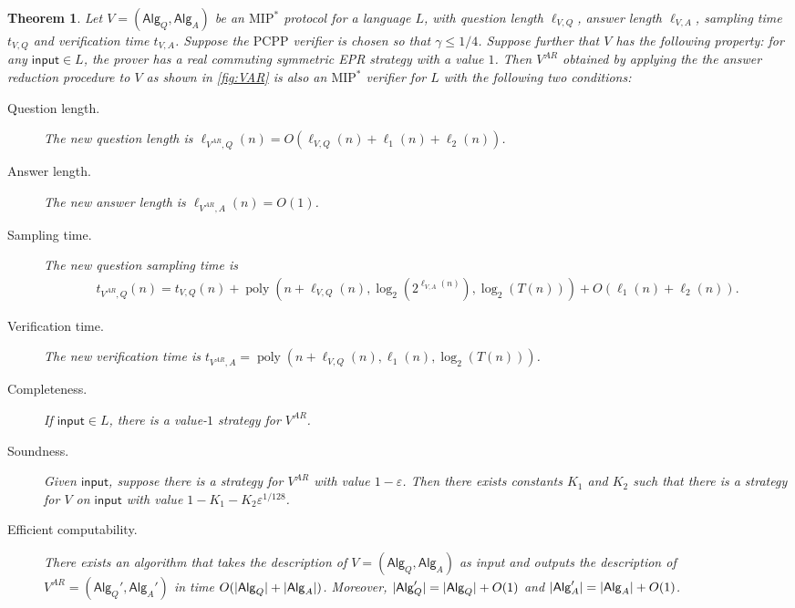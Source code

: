 \documentclass[10pt,a4paper]{article}
\theoremstyle{plain}
\newtheorem{theorem}{Theorem}[section]
\theoremstyle{definition}
\DeclarePairedDelimiter{\abs}{\lvert}{\rvert}
\newcommand{\poly} {\ensuremath{\operatorname{poly}}}
\newcommand{\ep} {\ensuremath{\varepsilon}}
\newcommand{\1}{\mathbb{1}} %
\newcommand{\PCPP}{\mathrm{PCPP}}
\newcommand{\ipt}{\mathsf{input}}
\newcommand{\Alg}{\mathsf{Alg}}
\newcommand{\MIP}{\mathrm{MIP}}
\begin{document}
\begin{theorem}
    \label{thm:answer_reduce}
	Let $V = (\Alg_Q, \Alg_A)$ be an $\MIP^\ast$ protocol for a language $L$,
    with question length $\ell_{V,Q}$, answer length $\ell_{V,A}$, sampling time $t_{V,Q}$
    and verification time $t_{V,A}$.
	Suppose the $\PCPP$ verifier is chosen so that $\gamma \leq 1/4$.
	Suppose further that $V$ has the following property: for any $\ipt \in L$, the prover has a 
	real commuting symmetric EPR strategy with a value $1$.
	Then $V^{AR}$ obtained by applying the the answer reduction procedure to $V$ as shown in \cref{fig:VAR} is also an
	$\MIP^\ast$ verifier for $L$ with the following two conditions:
	\begin{description}
        \item[Question length.] The new question length is $\ell_{V^{AR}, Q}(n) = O(\ell_{V,Q}(n) + \ell_1(n) + \ell_2(n))$.
        \item[Answer length.] The new answer length is $\ell_{V^{AR}, A}(n) = O(1)$.
        \item[Sampling time.] The new question sampling time is 
        \begin{align*}
            t_{V^{AR},Q}(n) = t_{V,Q}(n) + \poly(n+\ell_{V,Q}(n),\log_2(2^{\ell_{V,A}(n)}), \log_2(T(n))) + O(\ell_1(n) + \ell_2(n)).
        \end{align*}
        \item[Verification time.] The new verification time is $t_{V^{AR},A} = \poly(n+\ell_{V,Q}(n), \ell_1(n), \log_2(T(n)))$.
		\item[Completeness.] If $\ipt \in L$, there is a value-$1$ strategy for $V^{AR}$.
		\item[Soundness.] Given $\ipt$, suppose there is a strategy for $V^{AR}$ with value $1 - \ep$.
		Then there exists constants $K_1$ and $K_2$ such that there is a strategy for $V$ on $\ipt$ with
		value $1 - K_1 - K_2 \ep^{1/128}$.
        \item[Efficient computability.] There exists an algorithm that takes the description of $V = (\Alg_Q, \Alg_A)$ as input and outputs the description of $V^{AR} = (\Alg_Q', \Alg_A')$ in time $O( \abs{\Alg_Q}+ \abs{\Alg_A})$.
        Moreover, $\abs{\Alg_Q'} = \abs{\Alg_Q} +O(1)$ and $\abs{\Alg_A'} = \abs{\Alg_A}+O(1)$.
	\end{description}
\end{theorem}
\end{document}
